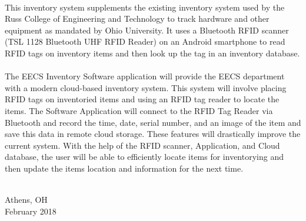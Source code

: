\begin{center}
\thispagestyle{empty}

\normalfont\sffamily\LARGE\bfseries\color{purple}{PREFACE}\\[1.0cm]
\end{center}
\thispagestyle{empty}

This inventory system supplements the existing inventory system used by the Russ College of Engineering and Technology to track hardware and other equipment as mandated by Ohio University. It uses a Bluetooth RFID scanner (TSL 1128 Bluetooth UHF RFID Reader) on an Android smartphone to read RFID tags on inventory items and then look up the tag in an inventory database.

\noindent\paragraph{}
The EECS Inventory Software application will provide the EECS department with a modern cloud-based inventory system. This system will involve placing RFID tags on inventoried items and using an RFID tag reader to locate the items. The Software Application will connect to the RFID Tag Reader via Bluetooth and record the time, date, serial number, and an image of the item and save this data in remote cloud storage. These features will drastically improve the current system. With the help of the RFID scanner, Application, and Cloud database, the user will be able to efficiently locate items for inventorying and then update the items location and information for the next time.

\vspace*{\fill}
{ \\ Athens, OH \\ February 2018\par}
